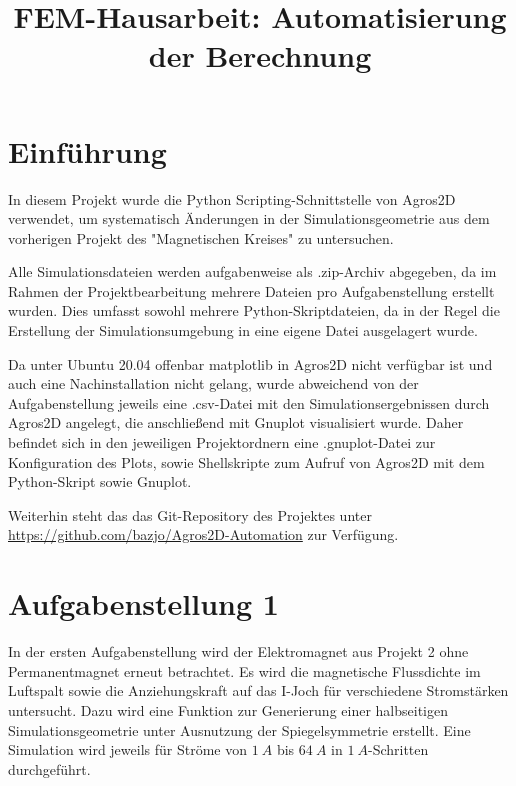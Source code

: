 \documentclass[conference,a4paper,twoside]{IEEEtran}
\begin{document}
\title{FEM-Hausarbeit: Automatisierung der Berechnung}

\author{
}

\maketitle


\section{Einführung}
In diesem Projekt wurde die Python Scripting-Schnittstelle von Agros2D verwendet, um systematisch Änderungen in der Simulationsgeometrie aus dem vorherigen Projekt des "Magnetischen Kreises" zu untersuchen.

Alle Simulationsdateien werden aufgabenweise als .zip-Archiv abgegeben, da im Rahmen der Projektbearbeitung mehrere Dateien pro Aufgabenstellung erstellt wurden. Dies umfasst sowohl mehrere Python-Skriptdateien, da in der Regel die Erstellung der Simulationsumgebung in eine eigene Datei ausgelagert wurde.

Da unter Ubuntu 20.04 offenbar matplotlib in Agros2D nicht verfügbar ist und auch eine Nachinstallation nicht gelang, wurde abweichend von der Aufgabenstellung jeweils eine .csv-Datei mit den Simulationsergebnissen durch Agros2D angelegt, die anschließend mit Gnuplot visualisiert wurde. Daher befindet sich in den jeweiligen Projektordnern eine .gnuplot-Datei zur Konfiguration des Plots, sowie Shellskripte zum Aufruf von Agros2D mit dem Python-Skript sowie Gnuplot.

Weiterhin steht das das Git-Repository des Projektes unter \url{https://github.com/bazjo/Agros2D-Automation} zur Verfügung.

\section{Aufgabenstellung 1}
In der ersten Aufgabenstellung wird der Elektromagnet aus Projekt 2 ohne Permanentmagnet erneut betrachtet. Es wird die magnetische Flussdichte im Luftspalt sowie die Anziehungskraft auf das I-Joch für verschiedene Stromstärken untersucht. Dazu wird eine Funktion zur Generierung einer halbseitigen Simulationsgeometrie unter Ausnutzung der Spiegelsymmetrie erstellt. Eine Simulation wird jeweils für Ströme von $1\ A$ bis $64\ A$ in $1\ A$-Schritten durchgeführt.
\end{document}
